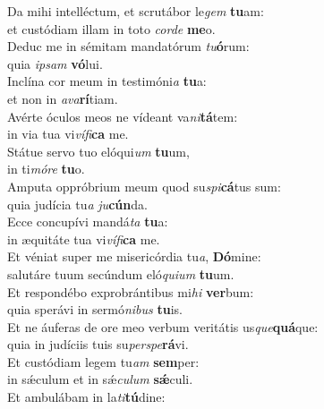 \evenverse Da mihi intelléctum, et scrutábor le\textit{gem} \textbf{tu}am:~\*\\
\evenverse et custódiam illam in toto \textit{cor}\textit{de} \textbf{me}o.\\
\oddverse Deduc me in sémitam mandatórum \textit{tu}\textbf{ó}rum:~\*\\
\oddverse quia \textit{i}\textit{psam} \textbf{vó}lui.\\
\evenverse Inclína cor meum in testimóni\textit{a} \textbf{tu}a:~\*\\
\evenverse et non in \textit{a}\textit{va}\textbf{rí}tiam.\\
\oddverse Avérte óculos meos ne vídeant va\textit{ni}\textbf{tá}tem:~\*\\
\oddverse in via tua vi\textit{ví}\textit{fi}\textbf{ca} me.\\
\evenverse Státue servo tuo elóqui\textit{um} \textbf{tu}um,~\*\\
\evenverse in ti\textit{mó}\textit{re} \textbf{tu}o.\\
\oddverse Amputa oppróbrium meum quod su\textit{spi}\textbf{cá}tus sum:~\*\\
\oddverse quia judícia tu\textit{a} \textit{ju}\textbf{cún}da.\\
\evenverse Ecce concupívi mandá\textit{ta} \textbf{tu}a:~\*\\
\evenverse in æquitáte tua vi\textit{ví}\textit{fi}\textbf{ca} me.\\
\oddverse Et véniat super me misericórdia tu\textit{a}, \textbf{Dó}mine:~\*\\
\oddverse salutáre tuum secúndum eló\textit{qui}\textit{um} \textbf{tu}um.\\
\evenverse Et respondébo exprobrántibus mi\textit{hi} \textbf{ver}bum:~\*\\
\evenverse quia sperávi in sermó\textit{ni}\textit{bus} \textbf{tu}is.\\
\oddverse Et ne áuferas de ore meo verbum veritátis us\textit{que}\textbf{quá}que:~\*\\
\oddverse quia in judíciis tuis su\textit{per}\textit{spe}\textbf{rá}vi.\\
\evenverse Et custódiam legem tu\textit{am} \textbf{sem}per:~\*\\
\evenverse in sǽculum et in sǽ\textit{cu}\textit{lum} \textbf{sǽ}culi.\\
\oddverse Et ambulábam in la\textit{ti}\textbf{tú}dine:~\*\\
